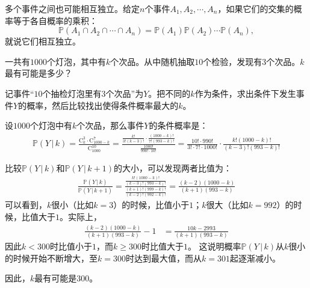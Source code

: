 \documentclass[12pt,UTF8,fontset=none]{ctexbook}
\begin{document}
多个事件之间也可能相互独立。给定$n$个事件$A_1, A_2, \cdots, A_n$，如果它们的交集的概率等于各自概率的乘积：
$$\mathbb{P}(A_1\cap A_2\cap \cdots \cap A_n) = \mathbb{P}(A_1) \mathbb{P}(A_2) \cdots \mathbb{P}(A_n),$$
就说它们相互独立。

\begin{et}
    一共有$1000$个灯泡，其中有$k$个次品。从中随机抽取$10$个检验，发现有$3$个次品。$k$最有可能是多少？
\end{et}

\begin{so}
    记事件“$10$个抽检灯泡里有$3$个次品”为$Y$。把不同的$k$作为条件，求出条件下发生事件$Y$的概率，然后比较找出使得条件概率最大的$k$。

    设$1000$个灯泡中有$k$个次品，那么事件$Y$的条件概率是：
    \begin{align*}
        \mathbb{P}(Y \,|\, k ) = \frac{\mathrm{C}_{k}^3 \cdot \mathrm{C}_{1000-k}^7}{\mathrm{C}_{1000}^{10}} = \frac{\frac{k!}{3!(k-3)!}\cdot \frac{(1000-k)!}{7!(993-k)!}}{\frac{1000!}{990!\cdot 10!}} = \frac{10!\cdot 990!}{3!\cdot 7!\cdot 1000!}\cdot \frac{k! (1000-k)!}{(k-3)!(993-k)!}
    \end{align*}

    比较$\mathbb{P}(Y \,|\, k )$和$\mathbb{P}(Y \,|\, k+1 )$的大小，可以发现两者比值为：
    \begin{align*}
        \frac{\mathbb{P}(Y \,|\, k )}{\mathbb{P}(Y \,|\, k + 1 )}= \frac{\frac{k! (1000-k)!}{(k-3)!(993-k)!}}{\frac{(k+1)! (999-k)!}{(k-2)!(992-k)!}} = \frac{(k - 2)(1000 - k)}{(k + 1)(993 - k)}
    \end{align*}
    可以看到，$k$很小（比如$k=3$）的时候，比值小于$1$；$k$很大（比如$k=992$）的时候，比值大于$1$。实际上，
    \begin{align*}
        \frac{(k - 2)(1000 - k)}{(k + 1)(993 - k)} - 1 &= \frac{10k -2993}{(k + 1)(993 - k)}
    \end{align*}
    因此$k<300$时比值小于$1$，而$k\geqslant 300$时比值大于$1$。
    这说明概率$\mathbb{P}(Y \,|\, k )$从$k$很小的时候开始不断增大，至$k=300$时达到最大值，而从$k=301$起逐渐减小。

    因此，$k$最有可能是$300$。
\end{so}
\end{document}
